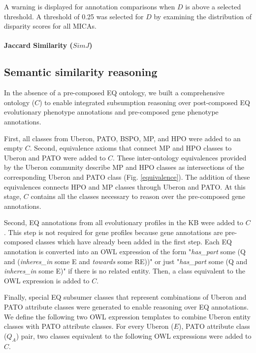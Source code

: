 \documentclass{article}
\begin{document}
A warning is displayed for annotation comparisons when $D$ is above a selected threshold. A threshold of 0.25 was selected for $D$ by examining the distribution of disparity scores for all MICAs. 

\paragraph{Jaccard Similarity ($SimJ$)}

\subsection{Semantic similarity reasoning}
\label{reasoning}
In the absence of a pre-composed EQ ontology, we built a comprehensive ontology ($C$) to enable integrated subsumption reasoning over post-composed EQ evolutionary phenotype annotations and pre-composed gene phenotype annotations. 

First, all classes from Uberon, PATO, BSPO, MP, and HPO were added to an empty $C$. Second, equivalence axioms that connect MP and HPO classes to Uberon and PATO were added to $C$. These inter-ontology equivalences provided by the Uberon community describe MP and HPO classes as intersections of the corresponding Uberon and PATO class (Fig. \ref{equivalence}). The addition of these equivalences connects HPO and MP classes through Uberon and PATO. At this stage, $C$ contains all the classes necessary to reason over the pre-composed gene annotations. 

Second, EQ annotations from all evolutionary profiles in the KB were added to $C$. This step is not required for gene profiles because gene annotations are pre-composed classes which have already been added in the first step. Each EQ annotation is converted into an OWL expression of the form "\textit{has\_part} some (Q and (\textit{inheres\_in} some E and \textit{towards} some RE))" or just "\textit{has\_part} some (Q and \textit{inheres\_in} some E)" if there is no related entity. Then, a class equivalent to the OWL expression is added to $C$. 

Finally, special EQ subsumer classes that represent combinations of Uberon and PATO attribute classes were generated to enable reasoning over EQ annotations. We define the following two OWL expression templates to combine Uberon entity classes with PATO attribute classes. For every Uberon ($E$), PATO attribute class ($Q_A$) pair, two classes equivalent to the following OWL expressions were added to $C$.
\end{document}
